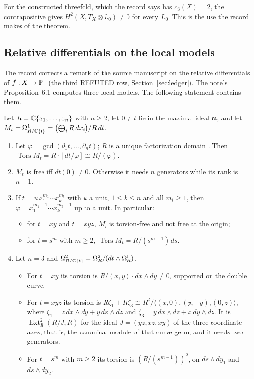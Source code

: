 For the constructed threefold, which the record says has $c_3(X)=2$, the contrapositive gives $H^2(X,T_X\otimes L_0)\neq0$ for every $L_0$. This is the use the record makes of the theorem.


\subsection{Relative differentials on the local models}\label{subsec:reldiff}

The record corrects a remark of the source manuscript on the relative differentials of $f:X\to\mathbb{P}^1$ (the third \textsf{REFUTED} row, Section~\ref{sec:ledger}). The note's Proposition~6.1 computes three local models. The following statement contains them.

\begin{proposition}\label{prop:torsion}
Let $R=\mathbb{C}\{x_1,\dots,x_n\}$ with $n\ge2$, let $0\neq t$ lie in the maximal ideal $\mathfrak m$, and let $M_t=\Omega^1_{R/\mathbb{C}\{t\}}=\bigl(\bigoplus_iR\,dx_i\bigr)/R\,dt$.
\begin{enumerate}[label=\textup{(\alph*)}]
\item Let $\varphi=\gcd(\partial_1t,\dots,\partial_nt)$; $R$ is a unique factorization domain \cite[Thm.~20.3]{Mat86}. Then $\operatorname{Tors}M_t=R\cdot[dt/\varphi]\cong R/(\varphi)$.
\item $M_t$ is free iff $dt(0)\neq0$. Otherwise it needs $n$ generators while its rank is $n-1$.
\item If $t=u\,x_1^{m_1}\cdots x_k^{m_k}$ with $u$ a unit, $1\le k\le n$ and all $m_i\ge1$, then $\varphi=x_1^{m_1-1}\cdots x_k^{m_k-1}$ up to a unit. In particular:
\begin{itemize}
\item for $t=xy$ and $t=xyz$, $M_t$ is torsion-free and not free at the origin;
\item for $t=s^m$ with $m\ge2$, $\operatorname{Tors}M_t=R/(s^{m-1})\,ds$.
\end{itemize}
\item Let $n=3$ and $\Omega^2_{R/\mathbb{C}\{t\}}=\Omega^2_R/(dt\wedge\Omega^1_R)$.
\begin{itemize}
\item For $t=xy$ its torsion is $R/(x,y)\cdot dx\wedge dy\neq0$, supported on the double curve.
\item For $t=xyz$ its torsion is $R\zeta_1+R\zeta_3\cong R^2/\langle(x,0),(y,-y),(0,z)\rangle$, where $\zeta_1=z\,dx\wedge dy+y\,dx\wedge dz$ and $\zeta_3=y\,dx\wedge dz+x\,dy\wedge dz$. It is $\operatorname{Ext}^2_R(R/J,R)$ for the ideal $J=(yz,xz,xy)$ of the three coordinate axes, that is, the canonical module of that curve germ, and it needs two generators.
\item For $t=s^m$ with $m\ge2$ its torsion is $(R/(s^{m-1}))^2$, on $ds\wedge dy_1$ and $ds\wedge dy_2$.
\end{itemize}
\end{enumerate}
\end{proposition}


